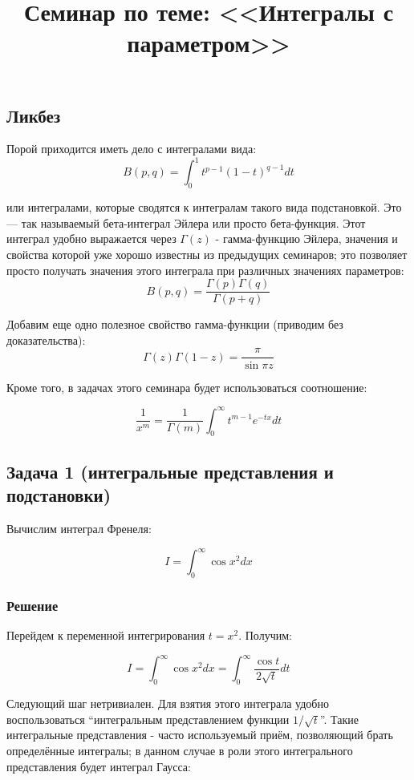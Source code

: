 \documentclass[a4paper,12pt]{article}
\begin{document}
\title{Семинар по теме: <<Интегралы с параметром>>}
\maketitle

\subsection*{Ликбез}

Порой приходится иметь дело с интегралами вида:
\[
B(p,q)=\int_{0}^{1}t^{p-1}(1-t)^{q-1}dt
\]

\noindent
или интегралами, которые сводятся к интегралам такого вида подстановкой.
Это --- так называемый бета-интеграл Эйлера или просто бета-функция.
Этот интеграл удобно выражается через $\Gamma(z)$ - гамма-функцию
Эйлера, значения и свойства которой уже хорошо известны из предыдущих
семинаров; это позволяет просто получать значения этого интеграла
при различных значениях параметров:
\[
B(p,q)=\frac{\Gamma(p)\Gamma(q)}{\Gamma(p+q)}
\]

\noindent
Добавим еще одно полезное свойство гамма-функции (приводим без доказательства):
\[
\Gamma(z)\Gamma(1-z)=\frac{\pi}{\sin\pi z}
\]

\noindent
Кроме того, в задачах этого семинара будет использоваться соотношение:

$$
\frac{1}{x^{m}}	=\frac{1}{\Gamma(m)}\int_{0}^{\infty}t^{m-1}e^{-tx}dt
$$

\subsection*{Задача 1 (интегральные представления и подстановки)}

Вычислим интеграл Френеля:

\[
I=\int_{0}^{\infty}\cos x^{2}dx
\]



\subsubsection*{Решение}

Перейдем к переменной интегрирования $t=x^{2}$. Получим:

\[
I=\int_{0}^{\infty}\cos x^{2}dx=\int_{0}^{\infty}\frac{\cos t}{2\sqrt{t}}dt
\]

\noindent
Следующий шаг нетривиален. Для взятия этого интеграла удобно воспользоваться
``интегральным представлением функции $1/\sqrt{t}$''. Такие интегральные
представления - часто используемый приём, позволяющий брать определённые
интегралы; в данном случае в роли этого интегрального представления
будет интеграл Гаусса:
\end{document}
